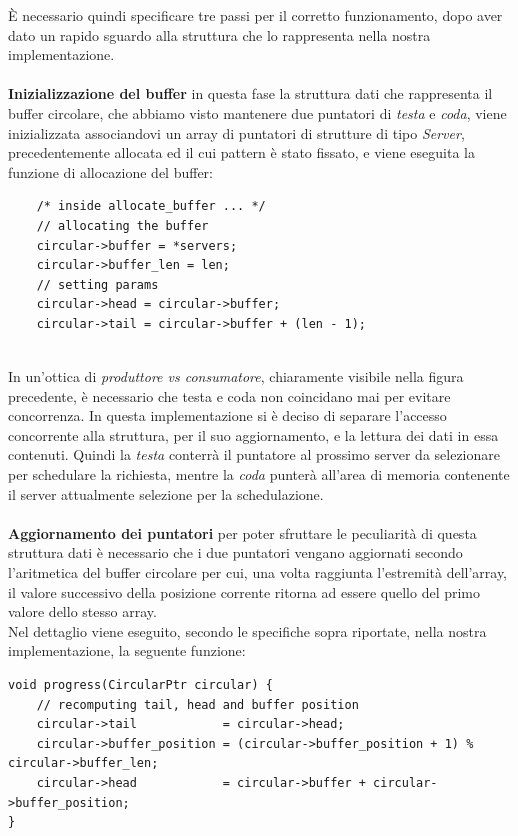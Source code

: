 \documentclass[italian]{tktltiki2}
\begin{document}
\break
È necessario quindi specificare tre passi per il corretto funzionamento, dopo aver dato un rapido sguardo alla struttura che lo rappresenta nella nostra implementazione. \\\\
\textbf{Inizializzazione del buffer} in questa fase la struttura dati che rappresenta il buffer circolare, che abbiamo visto mantenere due puntatori di \emph{testa} e \emph{coda}, viene inizializzata associandovi un array di puntatori di strutture di tipo \emph{Server}, precedentemente allocata ed il cui pattern è stato fissato, e viene eseguita la funzione di allocazione del buffer: 
\begin{lstlisting}
    /* inside allocate_buffer ... */
    // allocating the buffer
    circular->buffer = *servers;
    circular->buffer_len = len;
    // setting params
    circular->head = circular->buffer;
    circular->tail = circular->buffer + (len - 1);
    
\end{lstlisting}
In un'ottica di \emph{produttore vs consumatore}, chiaramente visibile nella figura precedente, è necessario che testa e coda non coincidano mai per evitare concorrenza. In questa implementazione si è deciso di separare l'accesso concorrente alla struttura, per il suo aggiornamento, e la lettura dei dati in essa contenuti. Quindi la \emph{testa} conterrà il puntatore al prossimo server da selezionare per schedulare la richiesta, mentre la \emph{coda} punterà all'area di memoria contenente il server attualmente selezione per la schedulazione. \\\\
\textbf{Aggiornamento dei puntatori} per poter sfruttare le peculiarità di questa struttura dati è necessario che i due puntatori vengano aggiornati secondo l'aritmetica del buffer circolare per cui, una volta raggiunta l'estremità dell'array, il valore successivo della posizione corrente ritorna ad essere quello del primo valore dello stesso array. \\
Nel dettaglio viene eseguito, secondo le specifiche sopra riportate, nella nostra implementazione, la seguente funzione:
\begin{lstlisting}
void progress(CircularPtr circular) {
    // recomputing tail, head and buffer position
    circular->tail            = circular->head;
    circular->buffer_position = (circular->buffer_position + 1) % circular->buffer_len;
    circular->head            = circular->buffer + circular->buffer_position;
}

\end{lstlisting}
\end{document}
